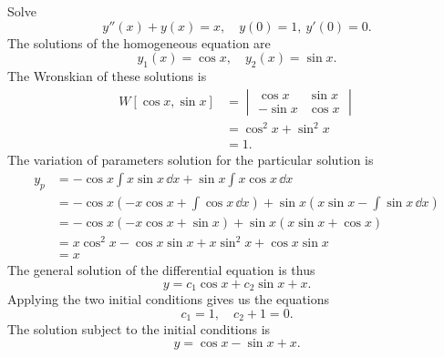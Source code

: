 {%
\begin{Solution}
  \label{solution y+y=x}
  Solve
  \[
  y''(x) + y(x) = x, \quad y(0) = 1,\ y'(0) = 0.
  \]
  The solutions of the homogeneous equation are
  \[
  y_1(x) = \cos x, \quad y_2(x) = \sin x.
  \]
  The Wronskian of these solutions is
  \begin{align*}
    W[\cos x, \sin x]
    &= \begin{vmatrix}
      \cos x & \sin x \\
      -\sin x & \cos x
    \end{vmatrix} \\
    &= \cos^2 x + \sin^2 x \\
    &= 1.
  \end{align*}
  The variation of parameters solution for the particular solution is
  \begin{align*}
    y_p
    &= -\cos x \int x \sin x \,\dd x
    + \sin x \int x \cos x \,\dd x \\
    &= -\cos x \left( -x \cos x + \int \cos x \,\dd x \right)
    + \sin x \left( x \sin x - \int \sin x \,\dd x \right) \\
    &= -\cos x \left( -x \cos x + \sin x \right)
    + \sin x \left( x \sin x + \cos x \right) \\
    &= x \cos^2 x - \cos x \sin x + x \sin^2 x + \cos x \sin x \\
    &= x
  \end{align*}
  The general solution of the differential equation is thus
  \[
  y = c_1 \cos x + c_2 \sin x + x.
  \]
  Applying the two initial conditions gives us the equations
  \[
  c_1 = 1, \quad c_2 + 1 = 0.
  \]
  The solution subject to the initial conditions is
  \[
  \boxed{
    y = \cos x - \sin x + x.
    }
  \]
\end{Solution}



}
